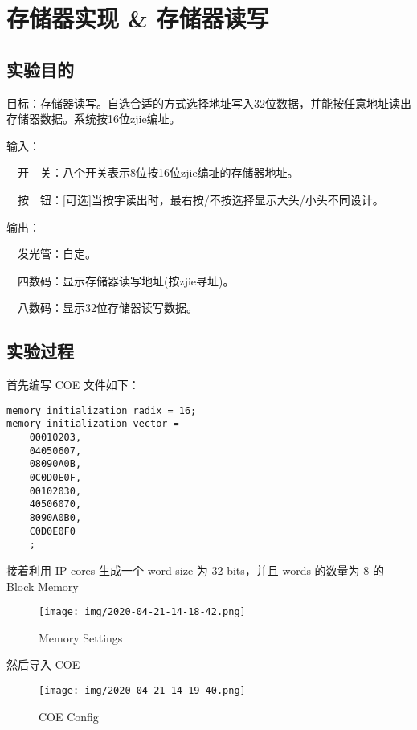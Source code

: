 \documentclass[UTF8]{ctexart}
\date{}
\begin{document}
\hypertarget{ux5b58ux50a8ux5668ux5b9eux73b0-ux5b58ux50a8ux5668ux8bfbux5199}{%
\section{存储器实现 \&
存储器读写}\label{ux5b58ux50a8ux5668ux5b9eux73b0-ux5b58ux50a8ux5668ux8bfbux5199}}

\hypertarget{ux5b9eux9a8cux76eeux7684}{%
\subsection{实验目的}\label{ux5b9eux9a8cux76eeux7684}}

目标：存储器读写。自选合适的方式选择地址写入32位数据，并能按任意地址读出存储器数据。系统按16位zjie编址。

输入：

　开　关：八个开关表示8位按16位zjie编址的存储器地址。

　按　钮：{[}可选{]}当按字读出时，最右按/不按选择显示大头/小头不同设计。

输出：

　发光管：自定。

　四数码：显示存储器读写地址(按zjie寻址)。

　八数码：显示32位存储器读写数据。

\hypertarget{ux5b9eux9a8cux8fc7ux7a0b}{%
\subsection{实验过程}\label{ux5b9eux9a8cux8fc7ux7a0b}}

首先编写 COE 文件如下：

\begin{verbatim}
memory_initialization_radix = 16;
memory_initialization_vector =
    00010203,
    04050607,
    08090A0B,
    0C0D0E0F,
    00102030,
    40506070,
    8090A0B0,
    C0D0E0F0
    ;
\end{verbatim}

接着利用 IP cores 生成一个 word size 为 32 bits，并且 words 的数量为 8
的 Block Memory

\begin{figure}
\centering
\texttt{[image: img/2020-04-21-14-18-42.png]}
\caption{Memory Settings}
\end{figure}

然后导入 COE

\begin{figure}
\centering
\texttt{[image: img/2020-04-21-14-19-40.png]}
\caption{COE Config}
\end{figure}
\end{document}
